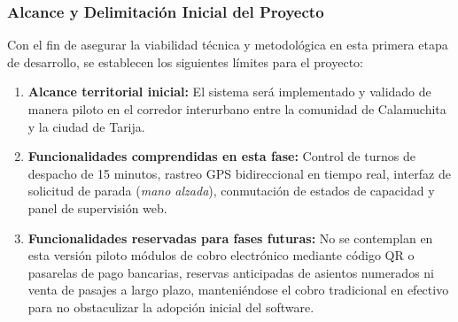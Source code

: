 \subsubsection{Alcance y Delimitación Inicial del Proyecto}

Con el fin de asegurar la viabilidad técnica y metodológica en esta primera etapa de desarrollo, se establecen los siguientes límites para el proyecto:

\begin{enumerate}[label=\alph*)]
    \item \textbf{Alcance territorial inicial:} El sistema será implementado y validado de manera piloto en el corredor interurbano entre la comunidad de Calamuchita y la ciudad de Tarija.
    \item \textbf{Funcionalidades comprendidas en esta fase:} Control de turnos de despacho de 15 minutos, rastreo GPS bidireccional en tiempo real, interfaz de solicitud de parada (\emph{mano alzada}), conmutación de estados de capacidad y panel de supervisión web.
    \item \textbf{Funcionalidades reservadas para fases futuras:} No se contemplan en esta versión piloto módulos de cobro electrónico mediante código QR o pasarelas de pago bancarias, reservas anticipadas de asientos numerados ni venta de pasajes a largo plazo, manteniéndose el cobro tradicional en efectivo para no obstaculizar la adopción inicial del software.
\end{enumerate}
